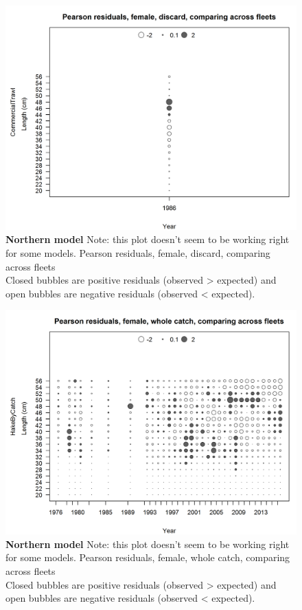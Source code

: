 \documentclass[12pt,]{article}
\begin{document}
\begin{figure}[htbp]
\centering
\includegraphics{./r4ss/plots_mod1/comp_lenfit_sex2mkt1_multi-fleet_comparison.png}
\caption{\textbf{Northern model} Note: this plot doesn't seem to be
working right for some models. Pearson residuals, female, discard,
comparing across fleets\\
Closed bubbles are positive residuals (observed \textgreater{} expected)
and open bubbles are negative residuals (observed \textless{} expected).
\label{fig:mod1_34_comp_lenfit_sex2mkt1_multi-fleet_comparison}}
\end{figure}

\begin{figure}[htbp]
\centering
\includegraphics{./r4ss/plots_mod1/comp_lenfit_sex2mkt0_multi-fleet_comparison.png}
\caption{\textbf{Northern model} Note: this plot doesn't seem to be
working right for some models. Pearson residuals, female, whole catch,
comparing across fleets\\
Closed bubbles are positive residuals (observed \textgreater{} expected)
and open bubbles are negative residuals (observed \textless{} expected).
\label{fig:mod1_35_comp_lenfit_sex2mkt0_multi-fleet_comparison}}
\end{figure}
\end{document}
